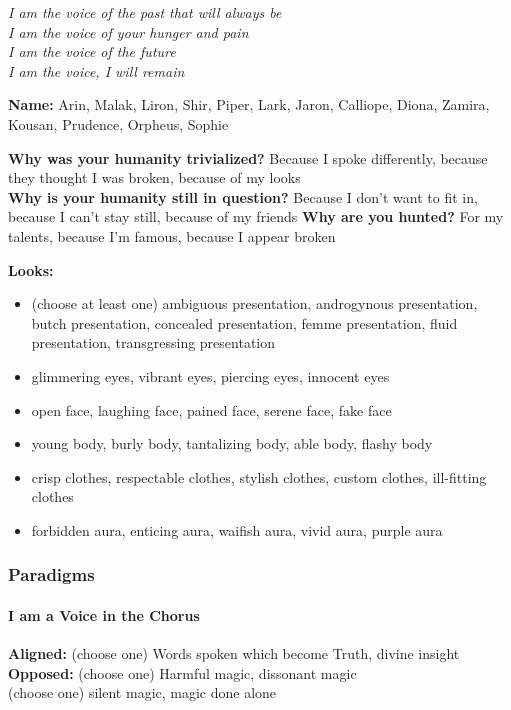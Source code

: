\documentclass[
]{article}
\providecommand{\tightlist}{%
  \setlength{\itemsep}{0pt}\setlength{\parskip}{0pt}}
\begin{document}
\emph{I am the voice of the past that will always be}\\
\emph{I am the voice of your hunger and pain}\\
\emph{I am the voice of the future}\\
\emph{I am the voice, I will remain}

\textbf{Name:} Arin, Malak, Liron, Shir, Piper, Lark, Jaron, Calliope,
Diona, Zamira, Kousan, Prudence, Orpheus, Sophie

\textbf{Why was your humanity trivialized?} Because I spoke differently,
because they thought I was broken, because of my looks\\
\textbf{Why is your humanity still in question?} Because I don't want to
fit in, because I can't stay still, because of my friends \textbf{Why
are you hunted?} For my talents, because I'm famous, because I appear
broken

\textbf{Looks:}

\begin{itemize}
\tightlist
\item
  (choose at least one) ambiguous presentation, androgynous
  presentation, butch presentation, concealed presentation, femme
  presentation, fluid presentation, transgressing presentation
\item
  glimmering eyes, vibrant eyes, piercing eyes, innocent eyes
\item
  open face, laughing face, pained face, serene face, fake face
\item
  young body, burly body, tantalizing body, able body, flashy body
\item
  crisp clothes, respectable clothes, stylish clothes, custom clothes,
  ill-fitting clothes
\item
  forbidden aura, enticing aura, waifish aura, vivid aura, purple aura
\end{itemize}

\hypertarget{paradigms-7}{%
\subsubsection{Paradigms}\label{paradigms-7}}

\hypertarget{i-am-a-voice-in-the-chorus}{%
\paragraph{I am a Voice in the
Chorus}\label{i-am-a-voice-in-the-chorus}}

\textbf{Aligned:} (choose one) Words spoken which become Truth, divine
insight\\
\textbf{Opposed:} (choose one) Harmful magic, dissonant magic\\
(choose one) silent magic, magic done alone
\end{document}
